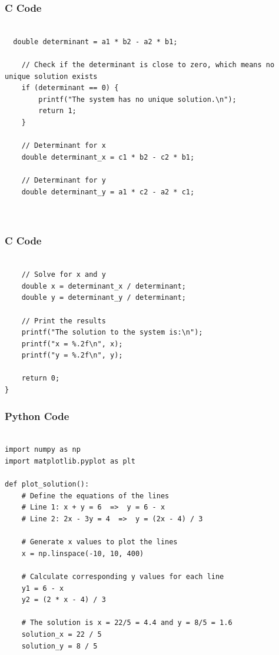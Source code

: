 \documentclass{beamer}
\begin{document}
\begin{frame}[fragile]
    \frametitle{C Code }
    \begin{lstlisting}

  double determinant = a1 * b2 - a2 * b1;

    // Check if the determinant is close to zero, which means no unique solution exists
    if (determinant == 0) {
        printf("The system has no unique solution.\n");
        return 1;
    }

    // Determinant for x
    double determinant_x = c1 * b2 - c2 * b1;
    
    // Determinant for y
    double determinant_y = a1 * c2 - a2 * c1;



    \end{lstlisting}
\end{frame}




\begin{frame}[fragile]
    \frametitle{C Code }
    \begin{lstlisting}

    // Solve for x and y
    double x = determinant_x / determinant;
    double y = determinant_y / determinant;

    // Print the results
    printf("The solution to the system is:\n");
    printf("x = %.2f\n", x);
    printf("y = %.2f\n", y);

    return 0;
}

      \end{lstlisting}
\end{frame} 


\begin{frame}[fragile]
    \frametitle{Python Code }
    \begin{lstlisting}

import numpy as np
import matplotlib.pyplot as plt

def plot_solution():
    # Define the equations of the lines
    # Line 1: x + y = 6  =>  y = 6 - x
    # Line 2: 2x - 3y = 4  =>  y = (2x - 4) / 3

    # Generate x values to plot the lines
    x = np.linspace(-10, 10, 400)

    # Calculate corresponding y values for each line
    y1 = 6 - x
    y2 = (2 * x - 4) / 3

    # The solution is x = 22/5 = 4.4 and y = 8/5 = 1.6
    solution_x = 22 / 5
    solution_y = 8 / 5


      \end{lstlisting}
\end{frame} 
\end{document}
